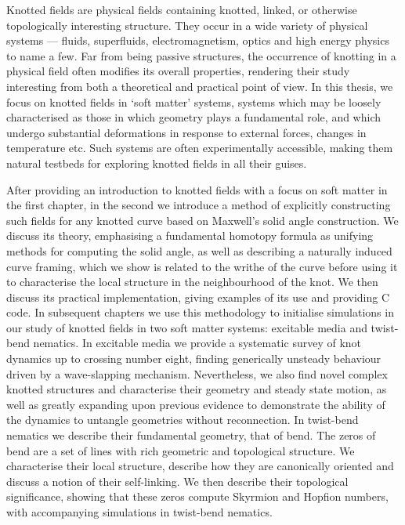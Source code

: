 Knotted fields are physical fields containing knotted, linked, or otherwise topologically interesting structure. They occur in a wide variety of physical systems --- fluids, superfluids, electromagnetism, optics and high energy physics to name a few. Far from being passive structures, the occurrence of knotting in a physical field often modifies its overall properties, rendering their study interesting from both a theoretical and practical point of view. In this thesis, we focus on knotted fields in `soft matter' systems, systems which may be loosely characterised as those in which geometry plays a fundamental role, and which undergo substantial deformations in response to external forces, changes in temperature etc. Such systems are often experimentally accessible, making them natural testbeds for exploring knotted fields in all their guises.  

After providing an introduction to knotted fields with a focus on soft matter in the first chapter, in the second we introduce a method of explicitly constructing such fields for any knotted curve based on Maxwell's solid angle construction. We discuss its theory, emphasising a fundamental homotopy formula as unifying methods for computing the solid angle, as well as describing a naturally induced curve framing, which we show is related to the writhe of the curve before using it to characterise the local structure in the neighbourhood of the knot. We then discuss its practical implementation, giving examples of its use and providing C code. In subsequent chapters we use this methodology to initialise simulations in our study of knotted fields in two soft matter systems: excitable media and twist-bend nematics. In excitable media we provide a systematic survey of knot dynamics up to crossing number eight, finding generically unsteady behaviour driven by a wave-slapping mechanism. Nevertheless, we also find novel complex knotted structures and characterise their geometry and steady state motion, as well as greatly expanding upon previous evidence to demonstrate the ability of the dynamics to untangle geometries without reconnection. In twist-bend nematics we describe their fundamental geometry, that of bend. The zeros of bend are a set of lines with rich geometric and topological structure. We characterise their local structure, describe how they are canonically oriented and discuss a notion of their self-linking. We then describe their topological significance, showing that these zeros compute Skyrmion and Hopfion numbers, with accompanying simulations in twist-bend nematics.   

